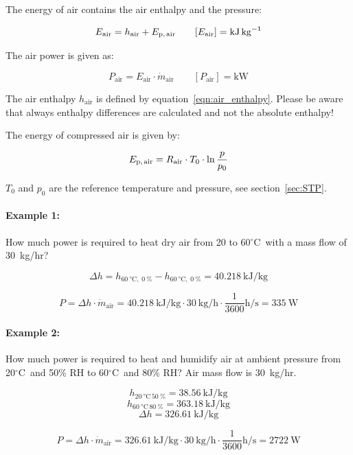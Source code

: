 \documentclass[11pt,a4paper,english,twoside]{scrreprt}
\newcommand{\gradC}{${}^\circ$C}      %
\begin{document}
The energy of air contains the air enthalpy and the pressure:

\[E_\text{air} =h_\text{air} + E_\text{p,\,air} \qquad [E_\text{air} ] = \si{\kilo\joule\per\kilogram}\]


The air power is given as:

\[
P_\text{air} =E_\text{air} \cdot \dot{m}_\text{air} \qquad [P_\text{air} ] = \si{\kilo\watt}
\]


The air enthalpy $h_\text{air}$ is defined by equation~\ref{eqn:air_enthalpy}. Please be aware that always enthalpy differences are calculated and not the absolute enthalpy!

The energy of compressed air is given by:

\[E_\text{p,\,air} =R_\text{air} \cdot T_0 \cdot \ln \frac{p}{p_0 } \]

$T_0 $ and $p_0 $ are the reference temperature and pressure, see section~\ref{sec:STP}.


\paragraph{Example 1:}
How much power is required to heat dry air from 20 to 60\gradC\ with a mass flow of 30~kg/hr?

\[\Delta h=h_{\SI{60}{\degreeCelsius},\;\SI{0}{\percent}}  - h_{\SI{60}{\degreeCelsius},\;\SI{0}{\percent}}  = \SI{40.218}{\kilo\joule\per\kilogram} 
\]

\[
P=\Delta h\cdot \dot{m}_\text{air}  = \SI{40.218}{\kilo\joule\per\kilogram} \cdot \SI{30}{\kilo\gram\per\hour} \cdot \frac{\num{1}}{\num{3600}}\si{\hour\per\second} = \SI{335}{\watt}
\]



\paragraph{Example 2:}
How much power is required to heat and humidify air at ambient pressure from 20\gradC\ and 50\% RH to 60\gradC\ and 80\% RH? Air mass flow is 30~kg/hr.

\[h_{\SI{20}{\degreeCelsius}\,\SI{50}{\percent}}  = \SI{38.56}{\kilo\joule\per\kilogram}\]
\[h_{\SI{60}{\degreeCelsius}\,\SI{80}{\percent}} = \SI{363.18}{\kilo\joule\per\kilogram}\]
\[\Delta h = \SI{326.61}{\kilo\joule\per\kilogram}\]

\[
P=\Delta h\cdot \dot{m}_\text{air}  = \SI{326.61}{\kilo\joule\per\kilogram} \cdot  \SI{30}{\kilo\gram\per\hour}  \cdot  \frac{\num{1}}{\num{3600}}\si{\hour\per\second} = \SI{2722}{\watt}
\]
\end{document}

